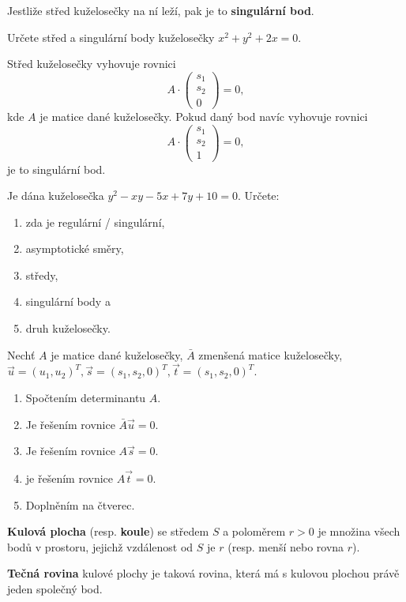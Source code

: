 \begin{definition}
    Jestliže střed kuželosečky na ní leží, pak je to \textbf{singulární bod}.
\end{definition}

\begin{priklad}
Určete střed a singulární body kuželosečky $x^2+y^2+2x=0.$
\end{priklad}

\begin{reseni}
Střed kuželosečky vyhovuje rovnici
$$A\cdot \begin{pmatrix}
    s_1 \\
    s_2\\
    0
\end{pmatrix}=0,
$$
kde $A$ je matice dané kuželosečky. Pokud daný bod navíc vyhovuje rovnici
$$A\cdot \begin{pmatrix}
    s_1 \\
    s_2\\
    1
\end{pmatrix}=0,
$$
je to singulární bod.
\end{reseni}

\begin{priklad}
Je dána kuželosečka $y^2-xy-5x+7y+10=0.$ Určete:
\begin{enumerate}[$a.$]
\item zda je regulární / singulární,
\item asymptotické směry,
\item středy,
\item singulární body a
\item druh kuželosečky.
\end{enumerate}
\end{priklad}

\begin{reseni}
Nechť $A$ je matice dané kuželosečky, $\bar{A}$ zmenšená matice kuželosečky, $\vec u=(u_1,u_2)^T, \vec s=(s_1,s_2,0)^T,\vec t=(s_1,s_2,0)^T$.
\begin{enumerate}[$a.$]
\item Spočtením determinantu $A$.
\item Je řešením rovnice $\bar A\vec u=0.$
\item Je řešením rovnice $A\vec s=0.$
\item je řešením rovnice $A\vec t = 0.$
\item Doplněním na čtverec.
\end{enumerate}
\end{reseni}

\begin{definition}
\textbf{Kulová plocha} (resp. \textbf{koule}) se středem $S$ a poloměrem $r>0$ je množina všech bodů v prostoru,
jejichž vzdálenost od $S$ je $r$ (resp. menší nebo rovna $r$).
\end{definition}

\begin{definition}
\textbf{Tečná rovina} kulové plochy je taková rovina, která má s kulovou plochou právě
jeden společný bod.
\end{definition}
